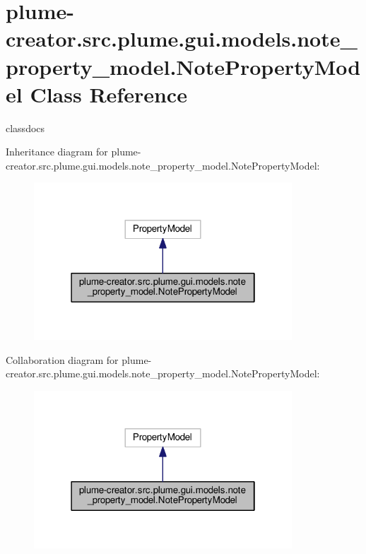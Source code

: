 \hypertarget{classplume-creator_1_1src_1_1plume_1_1gui_1_1models_1_1note__property__model_1_1_note_property_model}{}\section{plume-\/creator.src.\+plume.\+gui.\+models.\+note\+\_\+property\+\_\+model.\+Note\+Property\+Model Class Reference}
\label{classplume-creator_1_1src_1_1plume_1_1gui_1_1models_1_1note__property__model_1_1_note_property_model}


classdocs  




Inheritance diagram for plume-\/creator.src.\+plume.\+gui.\+models.\+note\+\_\+property\+\_\+model.\+Note\+Property\+Model\+:\nopagebreak
\begin{figure}[H]
\begin{center}
\leavevmode
\includegraphics[width=274pt]{classplume-creator_1_1src_1_1plume_1_1gui_1_1models_1_1note__property__model_1_1_note_property_model__inherit__graph}
\end{center}
\end{figure}


Collaboration diagram for plume-\/creator.src.\+plume.\+gui.\+models.\+note\+\_\+property\+\_\+model.\+Note\+Property\+Model\+:\nopagebreak
\begin{figure}[H]
\begin{center}
\leavevmode
\includegraphics[width=274pt]{classplume-creator_1_1src_1_1plume_1_1gui_1_1models_1_1note__property__model_1_1_note_property_model__coll__graph}
\end{center}
\end{figure}
